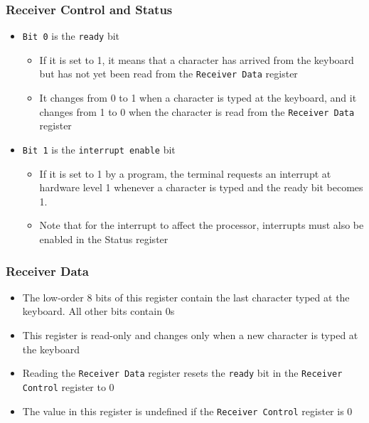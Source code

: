 \documentclass{beamer}
\begin{document}
\begin{frame}%
  \frametitle{Receiver Control and Status}

  \begin{itemize}
  \item \texttt{Bit 0} is the \texttt{ready} bit
    \begin{itemize}
    \item If it is set to 1, it means that a character has arrived from the keyboard but has not yet been read from the \texttt{Receiver Data} register
    \item It changes from 0 to 1 when a character is typed at the keyboard, and it changes from 1 to 0 when the character is read from the \texttt{Receiver Data} register
    \end{itemize}
    \vspace{0.4cm}
  \item \texttt{Bit 1} is the \texttt{interrupt enable} bit
    \begin{itemize}
    \item If it is set to 1 by a program, the terminal requests an interrupt at hardware level 1 whenever a character is typed and the ready bit becomes 1.
    \item Note that for the interrupt to affect the processor, interrupts must also be enabled in the Status register
    \end{itemize}
  \end{itemize}

\end{frame}

\begin{frame}%
  \frametitle{Receiver Data}

  \begin{itemize}
  \item The low-order 8 bits of this register contain the last character typed at the keyboard. All other bits contain 0s
    \vspace{0.2cm}
  \item This register is read-only and changes only when a new character is typed at the keyboard
    \vspace{0.2cm}
  \item Reading the \texttt{Receiver Data} register resets the \texttt{ready} bit in the \texttt{Receiver Control} register to 0
    \vspace{0.2cm}
  \item The value in this register is undefined if the \texttt{Receiver Control} register is 0
  \end{itemize}

\end{frame}
\end{document}
